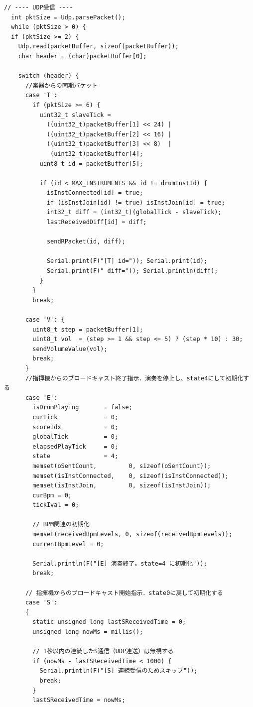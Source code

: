 \begin{lstlisting}[caption={drum\_0706.ino（楽譜データは冒頭2小節のみ掲載）}, label={lst:douki_drum_full}]
  // ---- UDP受信 ----
  int pktSize = Udp.parsePacket();
  while (pktSize > 0) {
  if (pktSize >= 2) {
    Udp.read(packetBuffer, sizeof(packetBuffer));
    char header = (char)packetBuffer[0];

    switch (header) {
      //楽器からの同期パケット
      case 'T':
        if (pktSize >= 6) {
          uint32_t slaveTick =
            ((uint32_t)packetBuffer[1] << 24) |
            ((uint32_t)packetBuffer[2] << 16) |
            ((uint32_t)packetBuffer[3] << 8)  |
             (uint32_t)packetBuffer[4];
          uint8_t id = packetBuffer[5];

          if (id < MAX_INSTRUMENTS && id != drumInstId) {
            isInstConnected[id] = true;
            if (isInstJoin[id] != true) isInstJoin[id] = true;
            int32_t diff = (int32_t)(globalTick - slaveTick);
            lastReceivedDiff[id] = diff;

            sendRPacket(id, diff);

            Serial.print(F("[T] id=")); Serial.print(id);
            Serial.print(F(" diff=")); Serial.println(diff);
          }
        }
        break;

      case 'V': {
        uint8_t step = packetBuffer[1];
        uint8_t vol  = (step >= 1 && step <= 5) ? (step * 10) : 30;
        sendVolumeValue(vol);
        break;
      }
      //指揮機からのブロードキャスト終了指示．演奏を停止し、state4にして初期化する
      case 'E':
        isDrumPlaying       = false;
        curTick             = 0;
        scoreIdx            = 0;
        globalTick          = 0;
        elapsedPlayTick     = 0;
        state               = 4;
        memset(oSentCount,         0, sizeof(oSentCount));
        memset(isInstConnected,    0, sizeof(isInstConnected));
        memset(isInstJoin,         0, sizeof(isInstJoin));
        curBpm = 0;
        tickIval = 0;

        // BPM関連の初期化
        memset(receivedBpmLevels, 0, sizeof(receivedBpmLevels));
        currentBpmLevel = 0;

        Serial.println(F("[E] 演奏終了。state=4 に初期化"));
        break;

      // 指揮機からのブロードキャスト開始指示．state0に戻して初期化する
      case 'S': 
      {
        static unsigned long lastSReceivedTime = 0;
        unsigned long nowMs = millis();
        
        // 1秒以内の連続したS通信（UDP連送）は無視する
        if (nowMs - lastSReceivedTime < 1000) {
          Serial.println(F("[S] 連続受信のためスキップ"));
          break;
        }
        lastSReceivedTime = nowMs;


\end{lstlisting}
